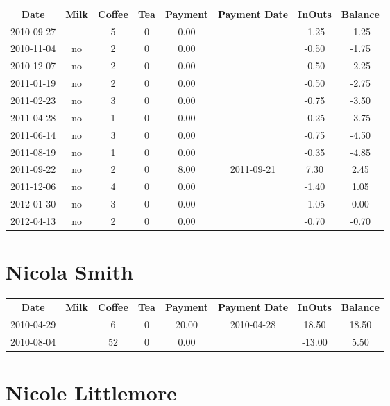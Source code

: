 \begin{center}
\begin{tabular}{cccccccc}
\textbf{Date} & \textbf{Milk} & \textbf{Coffee} & \textbf{Tea} & \textbf{Payment} & \textbf{Payment Date} & \textbf{InOuts} & \textbf{Balance} \\
2010-09-27 &  & 5 & 0 & 0.00 &  & -1.25 & -1.25\\ 
2010-11-04 & no & 2 & 0 & 0.00 &  & -0.50 & -1.75\\ 
2010-12-07 & no & 2 & 0 & 0.00 &  & -0.50 & -2.25\\ 
2011-01-19 & no & 2 & 0 & 0.00 &  & -0.50 & -2.75\\ 
2011-02-23 & no & 3 & 0 & 0.00 &  & -0.75 & -3.50\\ 
2011-04-28 & no & 1 & 0 & 0.00 &  & -0.25 & -3.75\\ 
2011-06-14 & no & 3 & 0 & 0.00 &  & -0.75 & -4.50\\ 
2011-08-19 & no & 1 & 0 & 0.00 &  & -0.35 & -4.85\\ 
2011-09-22 & no & 2 & 0 & 8.00 & 2011-09-21 &  7.30 &  2.45\\ 
2011-12-06 & no & 4 & 0 & 0.00 &  & -1.40 &  1.05\\ 
2012-01-30 & no & 3 & 0 & 0.00 &  & -1.05 &  0.00\\ 
2012-04-13 & no & 2 & 0 & 0.00 &  & -0.70 & -0.70
\end{tabular}
\end{center}

\section{Nicola Smith}

\begin{center}
\begin{tabular}{cccccccc}
\textbf{Date} & \textbf{Milk} & \textbf{Coffee} & \textbf{Tea} & \textbf{Payment} & \textbf{Payment Date} & \textbf{InOuts} & \textbf{Balance} \\
2010-04-29 &  &  6 & 0 & 20.00 & 2010-04-28 &  18.50 & 18.50\\ 
2010-08-04 &  & 52 & 0 &  0.00 &  & -13.00 &  5.50
\end{tabular}
\end{center}

\section{Nicole Littlemore}

